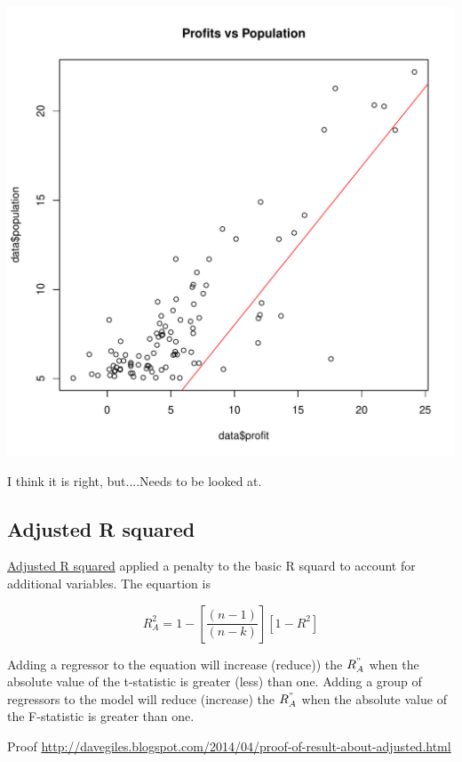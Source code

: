 \documentclass[12pt, a4paper, oneside]{article} %
\begin{document}
\begin{knitrout}
\includegraphics[width=\maxwidth]{figure/Regression3} 

\end{knitrout}
I think it is right, but....Needs to be looked at. 

\subsection{Adjusted R squared}
\href{http://davegiles.blogspot.ca/2013/05/when-will-adjusted-r-squared-increase.html}{Adjusted R squared} applied a penalty to the basic R squard to account for additional variables.  The equartion is 

\begin{equation}
R_A^2 = 1 - \left [ \frac{(n-1)}{(n-k)} \right ] [1 - R^2]
\end{equation}

Adding a regressor to the equation will increase (reduce)) the $R_A^"$ when the absolute value of the t-statistic is greater (less) than one. Adding a group of regressors to the model will reduce (increase) the $R_A^"$ when the absolute value of the F-statistic is greater than one.  

Proof \href{http://davegiles.blogspot.com/2014/04/proof-of-result-about-adjusted.html}{http://davegiles.blogspot.com/2014/04/proof-of-result-about-adjusted.html}
\end{document}
